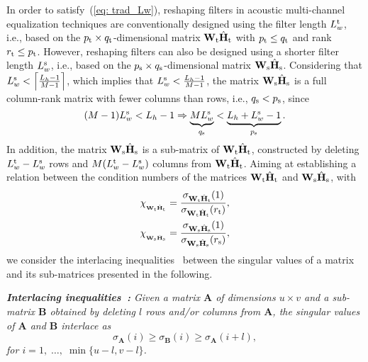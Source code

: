 \documentclass[twocolumn]{bmcart}%
\begin{document}
In order to satisfy~(\ref{eq: trad_Lw}), reshaping filters in acoustic multi-channel equalization techniques are conventionally designed using the filter length $L^{\rm t}_w$, i.e., based on the $p_{\rm t} \times q_{\rm t}$-dimensional matrix $\mathbf{W}_{\rm t}\hat{\mathbf{H}}_{\rm t}$ with $p_{\rm t} \leq q_{\rm t}$ and rank $r_{\rm t} \leq p_{\rm t}$.
However, reshaping filters can also be designed using a shorter filter length $L^{\rm s}_w$, i.e., based on the $p_{\rm s} \times q_{\rm s}$-dimensional matrix $\mathbf{W}_{\rm s}\hat{\mathbf{H}}_{\rm s}$.
Considering that $L^{\rm s}_w < \left\lceil{\frac{L_h-1}{M-1}}\right\rceil$, which implies that $L^{\rm s}_w < \frac{L_h-1}{M-1}$, the matrix $\mathbf{W}_{\rm s}\hat{\mathbf{H}}_{\rm s}$ is a full column-rank matrix with fewer columns than rows, i.e., $q_{\rm s} < p_{\rm s}$, since
\begin{equation}
(M-1)L^{\rm s}_w < L_h-1 \Rightarrow \underbrace{ML^{\rm s}_w}_{q_{\rm s}} < \underbrace{L_h + L^{\rm s}_w -1}_{p_{\rm s}}.
\end{equation}
In addition, the matrix $\mathbf{W}_{\rm s}\hat{\mathbf{H}}_{\rm s}$ is a sub-matrix of $\mathbf{W}_{\rm t}\hat{\mathbf{H}}_{\rm t}$, constructed by deleting $L^{\rm t}_w - L^{\rm s}_w$ rows and $M (L^{\rm t}_w - L^{\rm s}_w)$ columns from $\mathbf{W}_{\rm t}\hat{\mathbf{H}}_{\rm t}$.
Aiming at establishing a relation between the condition numbers of the matrices $\mathbf{W}_{\rm t}\hat{\mathbf{H}}_{\rm t}$ and $\mathbf{W}_{\rm s}\hat{\mathbf{H}}_{\rm s}$, with 
\begin{align}
\label{eq: cond_no_t}
  \chi_{_{\mathbf{W}_{\rm t}\hat{\mathbf{H}}_{\rm t}}} & = \frac{\sigma_{\mathbf{W}_{\rm t}\hat{\mathbf{H}}_{\rm t}}(1)}{\sigma_{\mathbf{W}_{\rm t}\hat{\mathbf{H}}_{\rm t}}(r_{\rm t})}, \\
    \label{eq: cond_no_s}
  \chi_{_{\mathbf{W}_{\rm s}\hat{\mathbf{H}}_{\rm s}}} &= \frac{\sigma_{\mathbf{W}_{\rm s}\hat{\mathbf{H}}_{\rm s}}(1)}{\sigma_{\mathbf{W}_{\rm s}\hat{\mathbf{H}}_{\rm s}}(r_{\rm s})},
\end{align}
we consider the interlacing inequalities~\cite{Horn_Mat_book} between the singular values of a matrix and its sub-matrices presented in the following.

{\textit{\textbf{Interlacing inequalities~\cite{Horn_Mat_book}:} \enspace
Given a matrix $\mathbf{A}$ of dimensions $u \times v$ and a sub-matrix $\mathbf{B}$ obtained by deleting $l$ rows and/or columns from $\mathbf{A}$, the singular values of $\mathbf{A}$ and $\mathbf{B}$ interlace as
\begin{equation}
\label{eq: inter_sing}
\sigma_{\mathbf{A}}(i) \geq \sigma_{\mathbf{B}}(i) \geq \sigma_{\mathbf{A}}(i+l),
\end{equation}
for $i = 1, \; \ldots, \; \min\{u-l,v-l\}$.
}}%
\end{document}
